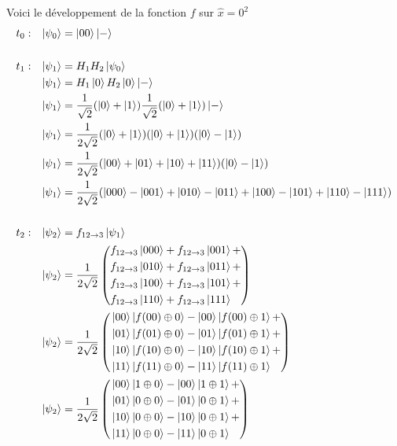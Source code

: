 \documentclass{article}
\begin{document}
Voici le développement de la fonction $f$ sur $\hat{x} = 0^2$
\begin{align*}
&t_0:& \ket{\psi_0} &= \ket{00}\ket{-} \\ \\
&t_1:& \ket{\psi_1} &= H_1H_2\ket{\psi_0} \\
&&     \ket{\psi_1} &= H_1\ket{0}H_2\ket{0}\ket{-} \\
&&     \ket{\psi_1} &= \frac{1}{\sqrt{2}}(\ket{0} + \ket{1})\frac{1}{\sqrt{2}}(\ket{0} + \ket{1})\ket{-} \\
&&     \ket{\psi_1} &= \frac{1}{2\sqrt{2}}(\ket{0} + \ket{1})(\ket{0} + \ket{1})(\ket{0} - \ket{1}) \\
&&     \ket{\psi_1} &=\frac{1}{2\sqrt{2}}(\ket{00} + \ket{01} + \ket{10} + \ket{11})(\ket{0} - \ket{1}) \\
&&     \ket{\psi_1}&= \frac{1}{2\sqrt{2}}(\ket{000} - \ket{001} + \ket{010} - \ket{011} + \ket{100} - \ket{101} + \ket{110} - \ket{111}) \\ \\
&t_2:& \ket{\psi_2} &= f_{12 \rightarrow 3}\ket{\psi_1} \\
&&     \ket{\psi_2} &= \frac{1}{2\sqrt{2}}\left(
        \begin{aligned}
            &f_{12 \rightarrow 3}\ket{000} + f_{12 \rightarrow 3}\ket{001} + \\
            &f_{12 \rightarrow 3}\ket{010} + f_{12 \rightarrow 3}\ket{011} + \\
            &f_{12 \rightarrow 3}\ket{100} + f_{12 \rightarrow 3}\ket{101} + \\
            &f_{12 \rightarrow 3}\ket{110} + f_{12 \rightarrow 3}\ket{111} \\
        \end{aligned}
    \right) \\
&&     \ket{\psi_2} &= \frac{1}{2\sqrt{2}}\left(
        \begin{aligned}
            &\ket{00}\ket{f(00) \oplus 0} - \ket{00}\ket{f(00) \oplus 1} + \\
            &\ket{01}\ket{f(01) \oplus 0} - \ket{01}\ket{f(01) \oplus 1} + \\
            &\ket{10}\ket{f(10) \oplus 0} - \ket{10}\ket{f(10) \oplus 1} + \\
            &\ket{11}\ket{f(11) \oplus 0} - \ket{11}\ket{f(11) \oplus 1}   \\
        \end{aligned}
    \right) \\
&&     \ket{\psi_2} &= \frac{1}{2\sqrt{2}}\left(
        \begin{aligned}
            &\ket{00}\ket{1 \oplus 0} - \ket{00}\ket{1 \oplus 1} + \\
            &\ket{01}\ket{0 \oplus 0} - \ket{01}\ket{0 \oplus 1} + \\
            &\ket{10}\ket{0 \oplus 0} - \ket{10}\ket{0 \oplus 1} + \\
            &\ket{11}\ket{0 \oplus 0} - \ket{11}\ket{0 \oplus 1}   \\
        \end{aligned}
    \right) \\
\end{align*}
\end{document}
